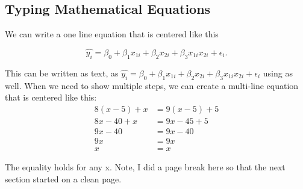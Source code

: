 \documentclass{article}\usepackage[]{graphicx}\usepackage[]{xcolor}
\begin{document}
\begin{multicols}{2}
\subsection {Typing Mathematical Equations}
We can write a one line equation that is centered like this
\begin{center}
\[\widehat{y_i} = \beta_0 + \beta_1 x_{1i}+ \beta_2 x_{2i} + \beta_3 x_{1i} x_{2i} + \epsilon_i.\]
\end{center}
This can be written as text, as $\widehat{y_i} = \beta_0 + \beta_1 x_{1i}+ \beta_2 x_{2i} + \beta_3 x_{1i} x_{2i} + \epsilon_i$ using as well.
  When we need to show multiple steps, we can create a
multi-line equation that is centered like this:
\begin{align*}
8(x - 5) + x&= 9(x - 5) + 5\\
  8x - 40 + x&= 9x - 45 + 5 \tag{Distributing}\\
    9x - 40&= 9x - 40 \tag{Combining Like Terms}\\
      9x&= 9x \tag{Adding 40 to both sides}\\
        x&= x \tag{Dividing both sides by 9}
\end{align*}

The equality holds for any x.
  Note, I did a page break here so that the next section
started on a clean page.
\pagebreak

\end{multicols}
\end{document}
